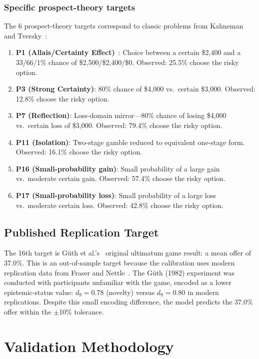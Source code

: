 \documentclass[journal]{IEEEtran}
\begin{document}
\subsubsection{Specific prospect-theory targets}
The 6 prospect-theory targets correspond to classic problems from Kahneman and Tversky~\cite{kahneman1979}:
\begin{enumerate}
    \item \textbf{P1 (Allais/Certainty Effect)}~\cite{allais1953}: Choice between a certain \$2,400 and a 33/66/1\% chance of \$2,500/\$2,400/\$0. Observed: 25.5\% choose the risky option.
    \item \textbf{P3 (Strong Certainty)}: 80\% chance of \$4,000 vs.\ certain \$3,000. Observed: 12.8\% choose the risky option.
    \item \textbf{P7 (Reflection)}: Loss-domain mirror---80\% chance of losing \$4,000 vs.\ certain loss of \$3,000. Observed: 79.4\% choose the risky option.
    \item \textbf{P11 (Isolation)}: Two-stage gamble reduced to equivalent one-stage form. Observed: 16.1\% choose the risky option.
    \item \textbf{P16 (Small-probability gain)}: Small probability of a large gain vs.\ moderate certain gain. Observed: 57.4\% choose the risky option.
    \item \textbf{P17 (Small-probability loss)}: Small probability of a large loss vs.\ moderate certain loss. Observed: 42.8\% choose the risky option.
\end{enumerate}

\subsection{Published Replication Target}

The 16th target is G\"uth et al.'s~\cite{guth1982} original ultimatum game result: a mean offer of 37.0\%.
This is an out-of-sample target because the calibration uses modern replication data from Fraser and Nettle~\cite{fraser2020}.
The G\"uth (1982) experiment was conducted with participants unfamiliar with the game, encoded as a lower epistemic-status value: $d_9 = 0.78$ (novelty) versus $d_9 = 0.80$ in modern replications.
Despite this small encoding difference, the model predicts the 37.0\% offer within the $\pm$10\% tolerance.


\section{Validation Methodology}
\label{sec:validation}
\end{document}
